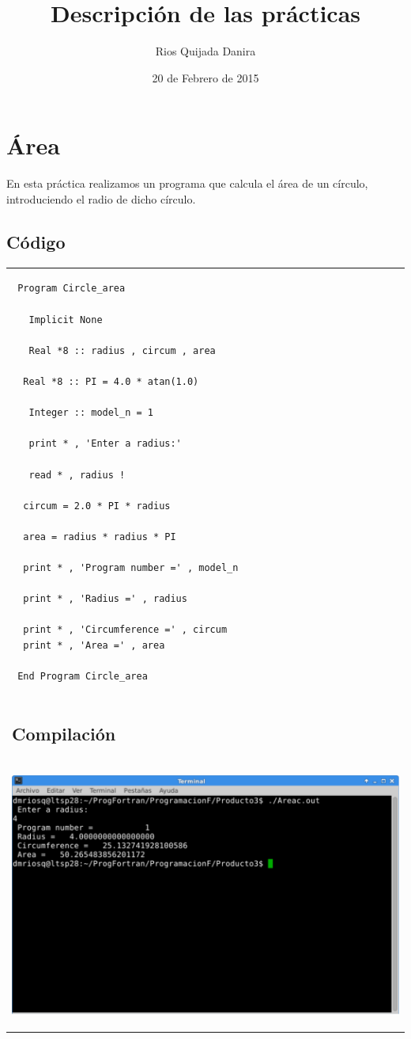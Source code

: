 \documentclass[10pt]{article}
\title{Descripción de las prácticas}
\author{Rios Quijada Danira}
\date{20 de Febrero de 2015}
\begin{document}
\maketitle
\section{Área}
En esta práctica realizamos un programa que calcula el área de un círculo, introduciendo el radio de dicho círculo.

\subsection{Código}
\begin{tabular}{l}
\begin{verbatim}  
 Program Circle_area 

   Implicit None 

   Real *8 :: radius , circum , area 

  Real *8 :: PI = 4.0 * atan(1.0) 

   Integer :: model_n = 1 

   print * , 'Enter a radius:' 

   read * , radius !

  circum = 2.0 * PI * radius 

  area = radius * radius * PI 

  print * , 'Program number =' , model_n 

  print * , 'Radius =' , radius 

  print * , 'Circumference =' , circum 
  print * , 'Area =' , area 

 End Program Circle_area
\end{verbatim} \\

\subsection{Compilación}\\

\begin{center}
   \includegraphics[scale=0.4]{A}
\end{center}
\end{tabular}
\end{document}
